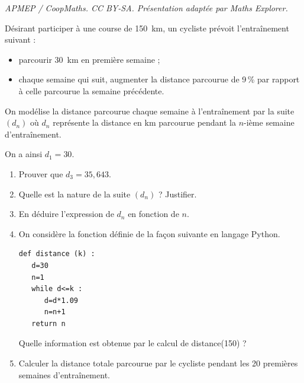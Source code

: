 \documentclass[10pt]{article}
\begin{document}
\noindent\textit{APMEP / CoopMaths. CC BY-SA. Présentation adaptée par Maths Explorer.}\par\medskip
\medskip

Désirant participer à une course de 150~km, un cycliste prévoit l'entraînement suivant :
\begin{itemize}
\item parcourir 30~km en première semaine ;
\item chaque semaine qui suit, augmenter la distance parcourue de 9\,\% par rapport à celle
parcourue la semaine précédente.
\end{itemize}
On modélise la distance parcourue chaque semaine à l'entraînement par la suite $\left(d_n\right)$ où $d_n$
représente la distance en km parcourue pendant la $n$-ième semaine d'entraînement.

On a ainsi $d_1 = 30$.

\medskip

\begin{enumerate}
\item Prouver que $d_3 = 35,643$.
\item Quelle est la nature de la suite $\left(d_n\right)$ ? Justifier.
\item En déduire l'expression de $d_n$ en fonction de $n$.
\item On considère la fonction définie de la façon suivante en langage Python.

\begin{lstlisting}[style=python]
 def distance (k) :
   d=30
   n=1
   while d<=k :
      d=d*1.09
 	  n=n+1
   return n
\end{lstlisting}

Quelle information est obtenue par le calcul de distance(150) ?
\item Calculer la distance totale parcourue par le cycliste pendant les 20 premières semaines
d'entraînement.

\end{enumerate}

\vspace{0,5cm}
\end{document}
